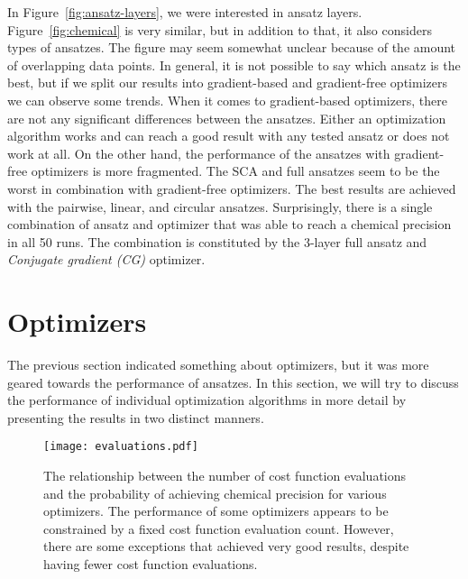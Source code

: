 In Figure~\ref{fig:ansatz-layers}, we were interested in ansatz layers. Figure~\ref{fig:chemical} is very similar, but in addition to that, it also considers types of ansatzes. The figure may seem somewhat unclear because of the amount of overlapping data points. In general, it is not possible to say which ansatz is the best, but if we split our results into gradient-based and gradient-free optimizers we can observe some trends. When it comes to gradient-based optimizers, there are not any significant differences between the ansatzes. Either an optimization algorithm works and can reach a good result with any tested ansatz or does not work at all. On the other hand, the performance of the ansatzes with gradient-free optimizers is more fragmented. The SCA and full ansatzes seem to be the worst in combination with gradient-free optimizers. The best results are achieved with the pairwise, linear, and circular ansatzes. Surprisingly, there is a single combination of ansatz and optimizer that was able to reach a chemical precision in all 50 runs. The combination is constituted by the 3-layer full ansatz and \textit{Conjugate gradient (CG)} optimizer.

\section{Optimizers}
The previous section indicated something about optimizers, but it was more geared towards the performance of ansatzes. In this section, we will try to discuss the performance of individual optimization algorithms in more detail by presenting the results in two distinct manners.

\begin{figure}[H]
    \centering
    \texttt{[image: evaluations.pdf]}
    \caption{The relationship between the number of cost function evaluations and the probability of achieving chemical precision for various optimizers. The performance of some optimizers appears to be constrained by a fixed cost function evaluation count. However, there are some exceptions that achieved very good results, despite having fewer cost function evaluations.}
    \label{fig:evaluations}
\end{figure}

